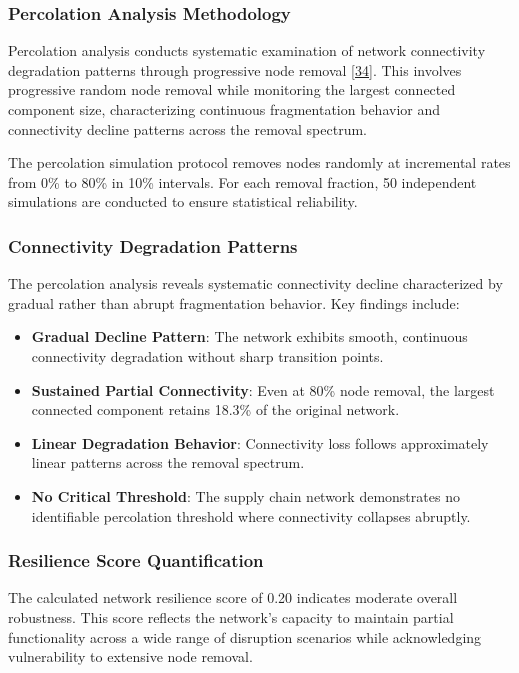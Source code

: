 \documentclass[a4 paper, 11pt,twoside]{article}
\newcommand{\0}{\Bf{0}}
\theoremstyle{definition}
\begin{document}
\subsubsection{Percolation Analysis Methodology}

Percolation analysis conducts systematic examination of network connectivity degradation patterns through progressive node removal \hyperref[ref34]{[34]}. This involves progressive random node removal while monitoring the largest connected component size, characterizing continuous fragmentation behavior and connectivity decline patterns across the removal spectrum.

The percolation simulation protocol removes nodes randomly at incremental rates from 0\% to 80\% in 10\% intervals. For each removal fraction, 50 independent simulations are conducted to ensure statistical reliability.

\subsubsection{Connectivity Degradation Patterns}

The percolation analysis reveals systematic connectivity decline characterized by gradual rather than abrupt fragmentation behavior. Key findings include:

\begin{itemize}
\item \textbf{Gradual Decline Pattern}: The network exhibits smooth, continuous connectivity degradation without sharp transition points.
\item \textbf{Sustained Partial Connectivity}: Even at 80\% node removal, the largest connected component retains 18.3\% of the original network.
\item \textbf{Linear Degradation Behavior}: Connectivity loss follows approximately linear patterns across the removal spectrum.
\item \textbf{No Critical Threshold}: The supply chain network demonstrates no identifiable percolation threshold where connectivity collapses abruptly.
\end{itemize}

\subsubsection{Resilience Score Quantification}

The calculated network resilience score of 0.20 indicates moderate overall robustness. This score reflects the network's capacity to maintain partial functionality across a wide range of disruption scenarios while acknowledging vulnerability to extensive node removal.
\end{document}
